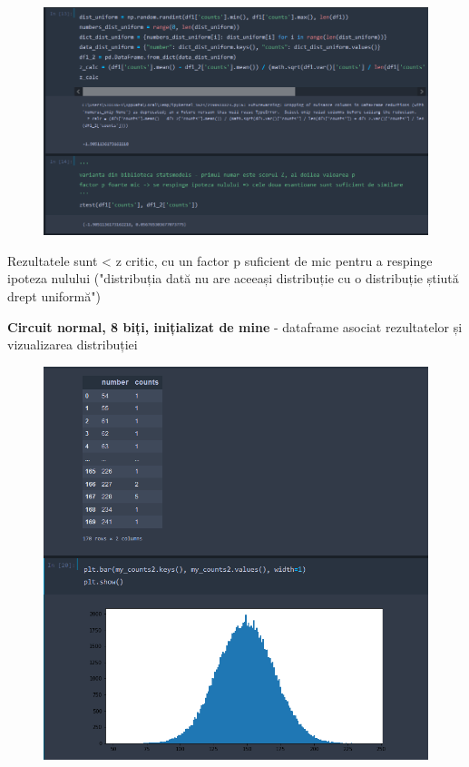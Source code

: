 \documentclass[12pt]{report}
\begin{document}
\begin{figure}[H]
    \centering
    \includegraphics[scale=0.8]{anexe/figuri/TestZ8bitiHadamard.png}
    \caption{}
    \label{fig:TestZ8BitiHadamard}
\end{figure}
Rezultatele sunt < z critic, cu un factor p suficient de mic pentru a respinge ipoteza nulului ("distribuția dată nu are aceeași distribuție cu o distribuție știută drept uniformă")

\textbf{Circuit normal, 8 biți, inițializat de mine} - dataframe asociat rezultatelor și vizualizarea distribuției

\begin{figure}[H]
    \centering
    \includegraphics{anexe/figuri/Normal8BitiEu.png}
    \caption{}
    \label{fig:RezultatNormal8BitiEu}
\end{figure}




\nopagebreak


\end{document}
